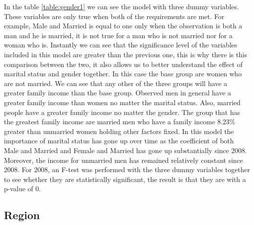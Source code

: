 \documentclass[12pt]{article}
\begin{document}
\begin{spacing}{1.5}
In the table \ref{table:gender1} we can see the model with three dummy variables. These variables are only true when both of the requirements are met. For example, Male and Married is equal to one only when the observation is both a man and he is married, it is not true for a man who is not married nor for a woman who is. Instantly we can see that the significance level of the variables included in this model are greater than the previous one, this is why there is this comparison between the two, it also allows us to better understand the effect of marital status and gender together. In this case the base group are women who are not married. We can see that any other of the three groups will have a greater family income than the base group. Observed men in general have a greater family income than women no matter the marital status. Also, married people have a greater family income no matter the gender. The group that has the greatest family income are married men who have a family income 8.23\% greater than unmarried women holding other factors fixed. In this model the importance of marital status has gone up over time as the coefficient of both Male and Married and Female and Married has gone up substantially since 2008. Moreover, the income for unmarried men has remained relatively constant since 2008. For 2008, an F-test was performed with the three dummy variables together to see whether they are statistically significant, the result is that they are with a p-value of 0.

\end{spacing}

\subsection{Region}
\end{document}
